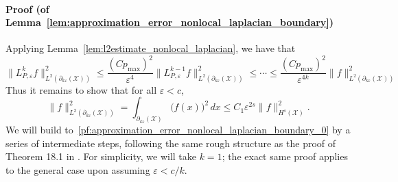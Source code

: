 \documentclass[aos]{imsart}
\theoremstyle{plain}
\theoremstyle{definition}
\theoremstyle{remark}
\newcommand{\mc}[1]{\mathcal{#1}}
\newcommand{\1}{\mathbf{1}}
\begin{document}
\paragraph{Proof (of Lemma~\ref{lem:approximation_error_nonlocal_laplacian_boundary})}
Applying Lemma~\ref{lem:l2estimate_nonlocal_laplacian}, we have that
\begin{equation*}
\|L_{P,\varepsilon}^kf\|_{L^2(\partial_{k\varepsilon}(\mc{X}))}^2 \leq \frac{(Cp_{\max})^{2}}{\varepsilon^4} \|L_{P,\varepsilon}^{k - 1}f\|_{L^2(\partial_{k\varepsilon}(\mc{X}))}^2 \leq \cdots \leq \frac{(Cp_{\max})^{2}}{\varepsilon^{4k}} \|f\|_{L^2(\partial_{k\varepsilon}(\mc{X}))}^2   
\end{equation*}
Thus it remains to show that for all $\varepsilon < c$,
\begin{equation}
\label{pf:approximation_error_nonlocal_laplacian_boundary_0}
\|f\|_{L^2(\partial_{k\varepsilon}(\mc{X}))}^2 = \int_{\partial_{k\varepsilon}(\mc{X})} \bigl(f(x)\bigr)^2 \,dx \leq C_1 \varepsilon^{2s} \|f\|_{H^s(\mc{X})}^2.
\end{equation}
We will build to~\eqref{pf:approximation_error_nonlocal_laplacian_boundary_0} by a series of intermediate steps, following the same rough structure as the proof of Theorem 18.1 in \citet{leoni2017}. For simplicity, we will take $k = 1$; the exact same proof applies to the general case upon assuming $\varepsilon < c/k$.
\end{document}
